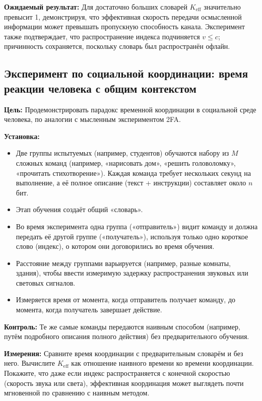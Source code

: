 \documentclass[12pt]{article}
\begin{document}
	\textbf{Ожидаемый результат:} Для достаточно больших словарей \(K_{\mathrm{eff}}\) значительно превысит 1, демонстрируя, что эффективная скорость передачи осмысленной информации может превышать пропускную способность канала. Эксперимент также подтверждает, что распространение индекса подчиняется \(v \le c\); причинность сохраняется, поскольку словарь был распространён офлайн.
	
	\subsection{Эксперимент по социальной координации: время реакции человека с общим контекстом}
	\label{subsec:social-experiment}
	
	\textbf{Цель:} Продемонстрировать парадокс временной координации в социальной среде человека, по аналогии с мысленным экспериментом 2FA.
	
	\textbf{Установка:}
	\begin{itemize}
		\item Две группы испытуемых (например, студентов) обучаются набору из \(M\) сложных команд (например, «нарисовать дом», «решить головоломку», «прочитать стихотворение»). Каждая команда требует нескольких секунд на выполнение, а её полное описание (текст + инструкции) составляет около \(n\) бит.
		\item Этап обучения создаёт общий «словарь».
		\item Во время эксперимента одна группа («отправитель») видит команду и должна передать её другой группе («получатель»), используя только одно короткое слово (индекс), о котором они договорились во время обучения.
		\item Расстояние между группами варьируется (например, разные комнаты, здания), чтобы ввести измеримую задержку распространения звуковых или световых сигналов.
		\item Измеряется время от момента, когда отправитель получает команду, до момента, когда получатель завершает действие.
	\end{itemize}
	
	\textbf{Контроль:} Те же самые команды передаются наивным способом (например, путём подробного описания полного действия) без предварительного обучения.
	
	\textbf{Измерения:} Сравните время координации с предварительным словарём и без него. Вычислите \(K_{\mathrm{eff}}\) как отношение наивного времени ко времени координации. Покажите, что даже если индекс распространяется с конечной скоростью (скорость звука или света), эффективная координация может выглядеть почти мгновенной по сравнению с наивным методом.
	
\end{document}
